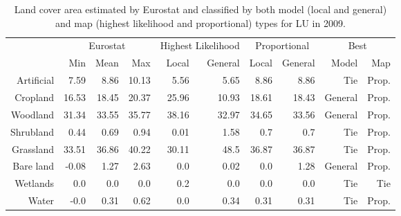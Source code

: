 \begin{table}[H]
\centering
\caption{Land cover area estimated by Eurostat and classified by both model (local and general) and map (highest likelihood and proportional) types for LU in 2009.}

\begin{tabular}{r|rrr|rr|rr|rr}
\toprule
{} & \multicolumn{3}{|c}{Eurostat} & \multicolumn{2}{|c}{Highest Likelihood} & \multicolumn{2}{|c}{Proportional} & \multicolumn{2}{|c}{Best} \\
{} &      Min &   Mean &    Max &              Local & General &        Local & General &    Model &    Map \\
\midrule
Artificial &     7.59 &   8.86 &  10.13 &               5.56 &    5.65 &         8.86 &    8.86 &      Tie &  Prop. \\
Cropland   &    16.53 &  18.45 &  20.37 &              25.96 &   10.93 &        18.61 &   18.43 &  General &  Prop. \\
Woodland   &    31.34 &  33.55 &  35.77 &              38.16 &   32.97 &        34.65 &   33.56 &  General &  Prop. \\
Shrubland  &     0.44 &   0.69 &   0.94 &               0.01 &    1.58 &          0.7 &     0.7 &      Tie &  Prop. \\
Grassland  &    33.51 &  36.86 &  40.22 &              30.11 &    48.5 &        36.87 &   36.87 &      Tie &  Prop. \\
Bare land  &    -0.08 &   1.27 &   2.63 &                0.0 &    0.02 &          0.0 &    1.28 &  General &  Prop. \\
Wetlands   &      0.0 &    0.0 &    0.0 &                0.2 &     0.0 &          0.0 &     0.0 &      Tie &    Tie \\
Water      &     -0.0 &   0.31 &   0.62 &                0.0 &    0.34 &         0.31 &    0.31 &      Tie &  Prop. \\
\bottomrule
\end{tabular}
\end{table}

